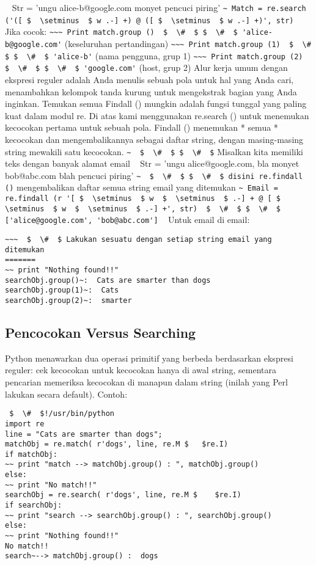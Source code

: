 \begin{enumerate}
\begin{enumerate}
~ Str = 'ungu alice-b@google.com monyet pencuci piring'
\verb|~ Match = re.search ('([ $  \setminus  $ w .-] +) @ ([ $  \setminus  $ w .-] +)', str)|
~ Jika cocok:
\verb|~~~ Print match.group ()  $  \#  $ $  \#  $ 'alice-b@google.com'| (keseluruhan pertandingan)
\verb|~~~ Print match.group (1)  $  \#  $ $  \#  $ 'alice-b'| (nama pengguna, grup 1)
\verb|~~~ Print match.group (2)  $  \#  $ $  \#  $ 'google.com'| (host, grup 2)
Alur kerja umum dengan ekspresi reguler adalah Anda menulis sebuah pola untuk hal yang Anda cari, menambahkan kelompok tanda kurung untuk mengekstrak bagian yang Anda inginkan. Temukan semua Findall () mungkin adalah fungsi tunggal yang paling kuat dalam modul re. Di atas kami menggunakan re.search () untuk menemukan kecocokan pertama untuk sebuah pola. Findall () menemukan * semua * kecocokan dan mengembalikannya sebagai daftar string, dengan masing-masing string mewakili satu kecocokan.
\verb|~  $  \#  $ $  \#  $| Misalkan kita memiliki teks dengan banyak alamat email
~ Str = 'ungu alice@google.com, bla monyet bob@abc.com blah pencuci piring'
\verb|~  $  \#  $ $  \#  $ disini re.findall ()| mengembalikan daftar semua string email yang ditemukan
\verb|~ Email = re.findall (r '[ $  \setminus  $ w  $  \setminus  $ .-] + @ [ $  \setminus  $ w  $  \setminus  $ .-] +', str)  $  \#  $ $  \#  $ ['alice@google.com', 'bob@abc.com']|
~ Untuk email di email:
\begin{verbatim}
~~~  $  \#  $ Lakukan sesuatu dengan setiap string email yang ditemukan
=======
~~ print "Nothing found!!"
searchObj.group()~:  Cats are smarter than dogs
searchObj.group(1)~:  Cats
searchObj.group(2)~:  smarter
\end{verbatim}
\subsection{Pencocokan Versus Searching}
Python menawarkan dua operasi primitif yang berbeda berdasarkan ekspresi reguler: cek kecocokan untuk kecocokan hanya di awal string, sementara pencarian memeriksa kecocokan di manapun dalam string (inilah yang Perl lakukan secara default).
Contoh:
\begin{verbatim}
 $  \#  $!/usr/bin/python
import re
line = "Cats are smarter than dogs";
matchObj = re.match( r'dogs', line, re.M $   $re.I)
if matchObj:
~~ print "match --> matchObj.group() : ", matchObj.group()
else:
~~ print "No match!!"
searchObj = re.search( r'dogs', line, re.M $    $re.I)
if searchObj:
~~ print "search --> searchObj.group() : ", searchObj.group()
else:
~~ print "Nothing found!!"
No match!!
search~--> matchObj.group() :  dogs
\end{verbatim}

\end{enumerate}
\end{enumerate}
